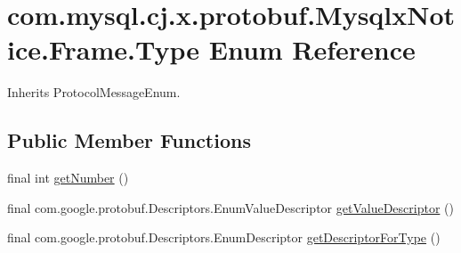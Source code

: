 \hypertarget{enumcom_1_1mysql_1_1cj_1_1x_1_1protobuf_1_1_mysqlx_notice_1_1_frame_1_1_type}{}\section{com.\+mysql.\+cj.\+x.\+protobuf.\+Mysqlx\+Notice.\+Frame.\+Type Enum Reference}
\label{enumcom_1_1mysql_1_1cj_1_1x_1_1protobuf_1_1_mysqlx_notice_1_1_frame_1_1_type}


Inherits Protocol\+Message\+Enum.

\subsection*{Public Member Functions}
\begin{DoxyCompactItemize}
\item 
final int \mbox{\hyperlink{enumcom_1_1mysql_1_1cj_1_1x_1_1protobuf_1_1_mysqlx_notice_1_1_frame_1_1_type_ac463d47d7382816f379b32bfb6908c71}{get\+Number}} ()
\item 
final com.\+google.\+protobuf.\+Descriptors.\+Enum\+Value\+Descriptor \mbox{\hyperlink{enumcom_1_1mysql_1_1cj_1_1x_1_1protobuf_1_1_mysqlx_notice_1_1_frame_1_1_type_a2c4b503d28e32bf532df2e565c82cc53}{get\+Value\+Descriptor}} ()
\item 
final com.\+google.\+protobuf.\+Descriptors.\+Enum\+Descriptor \mbox{\hyperlink{enumcom_1_1mysql_1_1cj_1_1x_1_1protobuf_1_1_mysqlx_notice_1_1_frame_1_1_type_af070c7d9804c4ba17740f896756fd654}{get\+Descriptor\+For\+Type}} ()
\end{DoxyCompactItemize}
